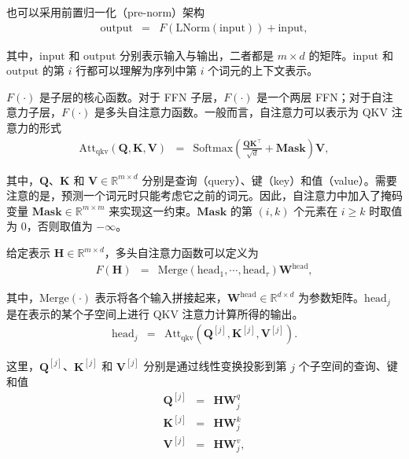 \noindent 也可以采用前置归一化（pre-norm）架构
\begin{eqnarray}
\mathrm{output} & = & F(\mathrm{LNorm}(\mathrm{input})) + \mathrm{input} \label{eq:pre-norm-lm},
\end{eqnarray}

\noindent 其中，$\mathrm{input}$ 和 $\mathrm{output}$ 分别表示输入与输出，二者都是 $m \times d$ 的矩阵。$\mathrm{input}$ 和 $\mathrm{output}$ 的第 $i$ 行都可以理解为序列中第 $i$ 个词元的上下文表示。

$F(\cdot)$ 是子层的核心函数。对于 FFN 子层，$F(\cdot)$ 是一个两层 FFN；对于自注意力子层，$F(\cdot)$ 是多头自注意力函数。一般而言，自注意力可以表示为 QKV 注意力的形式
\begin{eqnarray}
\mathrm{Att}_{\mathrm{qkv}}(\mathbf{Q},\mathbf{K},\mathbf{V}) & = & \mathrm{Softmax}(\frac{\mathbf{Q} \mathbf{K}^\top}{\sqrt{d}} + \mathbf{Mask}) \mathbf{V} \label{eq:qkv-attention-lm},
\end{eqnarray}

\noindent 其中，$\mathbf{Q}$、$\mathbf{K}$ 和 $\mathbf{V} \in \mathbb{R}^{m \times d}$ 分别是查询（query）、键（key）和值（value）。需要注意的是，预测一个词元时只能考虑它之前的词元。因此，自注意力中加入了掩码变量 $\mathbf{Mask} \in \mathbb{R}^{m \times m}$ 来实现这一约束。$\mathbf{Mask}$ 的第 $(i,k)$ 个元素在 $i \ge k$ 时取值为 0，否则取值为 $-\infty$。

给定表示 $\mathbf{H} \in \mathbb{R}^{m \times d}$，多头自注意力函数可以定义为
\begin{eqnarray}
F(\mathbf{H}) & = & \mathrm{Merge}(\mathrm{head}_1,\cdots,\mathrm{head}_{\tau}) \mathbf{W}^{\mathrm{head}},
\end{eqnarray}

\noindent 其中，$\mathrm{Merge}(\cdot)$ 表示将各个输入拼接起来，$\mathbf{W}^{\mathrm{head}} \in \mathbb{R}^{d \times d}$ 为参数矩阵。$\mathrm{head}_j$ 是在表示的某个子空间上进行 QKV 注意力计算所得的输出。
\begin{eqnarray}
\mathrm{head}_j & = & \mathrm{Att}_{\mathrm{qkv}}(\mathbf{Q}^{[j]},\mathbf{K}^{[j]},\mathbf{V}^{[j]}).
\end{eqnarray}

\noindent 这里，$\mathbf{Q}^{[j]}$、$\mathbf{K}^{[j]}$ 和 $\mathbf{V}^{[j]}$ 分别是通过线性变换投影到第 $j$ 个子空间的查询、键和值
\begin{eqnarray}
\mathbf{Q}^{[j]} & = & \mathbf{H} \mathbf{W}_j^{q} \\
\mathbf{K}^{[j]} & = & \mathbf{H} \mathbf{W}_j^{k} \\
\mathbf{V}^{[j]} & = & \mathbf{H} \mathbf{W}_j^{v},
\end{eqnarray}

